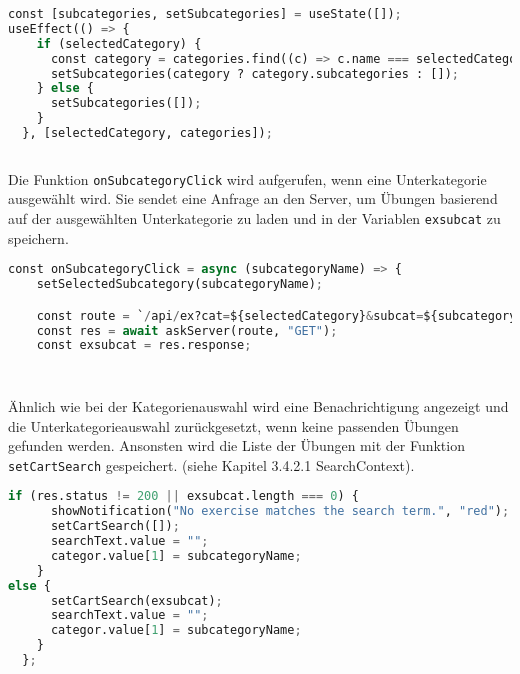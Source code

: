 \begin{lstlisting}[language=Python]
const [subcategories, setSubcategories] = useState([]);
useEffect(() => {
    if (selectedCategory) {
      const category = categories.find((c) => c.name === selectedCategory);
      setSubcategories(category ? category.subcategories : []);
    } else {
      setSubcategories([]);
    }
  }, [selectedCategory, categories]);
      
\end{lstlisting}



Die Funktion \texttt{onSubcategoryClick} wird aufgerufen, wenn eine Unterkategorie ausgewählt wird. Sie sendet eine Anfrage an den Server, um Übungen basierend auf der ausgewählten Unterkategorie zu laden und in der Variablen \texttt{exsubcat} zu speichern.

\begin{lstlisting}[language=Python]
const onSubcategoryClick = async (subcategoryName) => {
    setSelectedSubcategory(subcategoryName);

    const route = `/api/ex?cat=${selectedCategory}&subcat=${subcategoryName}`;
    const res = await askServer(route, "GET");
    const exsubcat = res.response;
    
    
\end{lstlisting}

 Ähnlich wie bei der Kategorienauswahl wird eine Benachrichtigung angezeigt und die Unterkategorieauswahl zurückgesetzt, wenn keine passenden Übungen gefunden werden. Ansonsten wird die Liste der Übungen mit der Funktion \texttt{setCartSearch} gespeichert. (siehe Kapitel 3.4.2.1 SearchContext).


\begin{lstlisting}[language=Python]
if (res.status != 200 || exsubcat.length === 0) {
      showNotification("No exercise matches the search term.", "red");
      setCartSearch([]);
      searchText.value = "";
      categor.value[1] = subcategoryName;
    }
else {
      setCartSearch(exsubcat);
      searchText.value = "";
      categor.value[1] = subcategoryName;
    }
  };
\end{lstlisting}